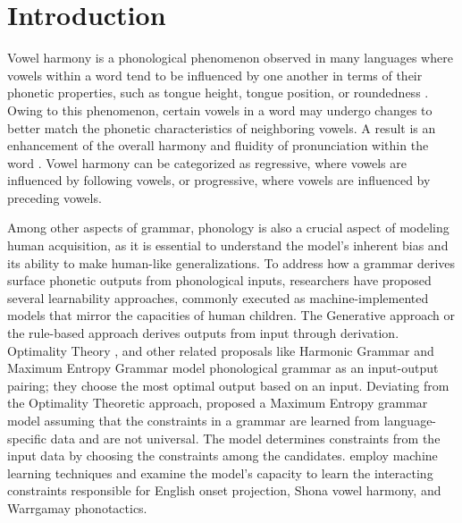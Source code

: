 \documentclass{Interspeech2024}
\begin{document}
\section{Introduction}
Vowel harmony is a phonological phenomenon observed in many languages where vowels within a word tend to be influenced by one another in terms of their phonetic properties, such as tongue height, tongue position, or roundedness \cite{blevins2004evolutionary, rose2011harmony}. Owing to this phenomenon, certain vowels in a word may undergo changes to better match the phonetic characteristics of neighboring vowels. A result is an enhancement of the overall harmony and fluidity of pronunciation within the word \cite{ohala94b_icslp}. Vowel harmony can be categorized as regressive, where vowels are influenced by following vowels, or progressive, where vowels are influenced by preceding vowels.


Among other aspects of grammar, phonology is also a crucial aspect of modeling human acquisition, as it is essential to understand the model's inherent bias and its ability to make human-like generalizations. To address how a grammar derives surface phonetic outputs from phonological inputs, researchers have proposed several learnability approaches, commonly executed as machine-implemented models that mirror the capacities of human children. The Generative approach or the rule-based approach \cite{chomsky_sound_1968} derives outputs from input through derivation. Optimality Theory \cite{prince_optimality_2004}, and other related proposals like Harmonic Grammar and Maximum Entropy Grammar \cite{legendre_can_1990,goldwater_learning_2003,hayes_maximum_2008,pater_weighted_2009} model phonological grammar as an input-output pairing; they choose the most optimal output based on an input. Deviating from the Optimality Theoretic approach, \cite{hayes_maximum_2008} proposed a Maximum Entropy grammar model assuming that the constraints in a grammar are learned from language-specific data and are not universal. The model determines constraints from the input data by choosing the constraints among the candidates. \cite{hayes_maximum_2008} employ machine learning techniques and examine the model's capacity to learn the interacting constraints responsible for English onset projection, Shona vowel harmony, and Warrgamay phonotactics.
\end{document}

